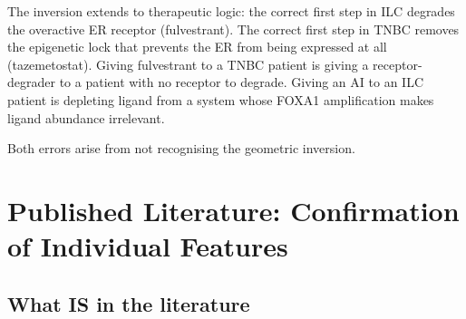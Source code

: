 \documentclass[12pt, a4paper]{article}
\begin{document}
The inversion extends to therapeutic logic:
the correct first step in ILC degrades the
overactive ER receptor (fulvestrant). The
correct first step in TNBC removes the
epigenetic lock that prevents the ER from
being expressed at all (tazemetostat). Giving
fulvestrant to a TNBC patient is giving a
receptor-degrader to a patient with no receptor
to degrade. Giving an AI to an ILC patient
is depleting ligand from a system whose FOXA1
amplification makes ligand abundance irrelevant.

Both errors arise from not recognising the
geometric inversion.

\section{Published Literature: Confirmation
of Individual Features}

\subsection{What IS in the literature}
\end{document}
